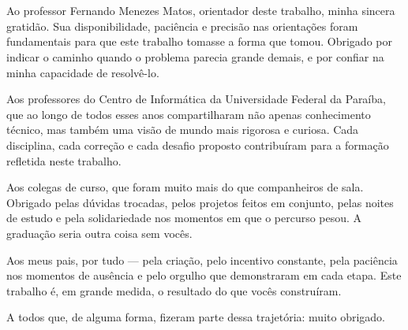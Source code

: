 \section*{}

Ao professor Fernando Menezes Matos, orientador deste trabalho, minha sincera gratidão. Sua disponibilidade, paciência e precisão nas orientações foram fundamentais para que este trabalho tomasse a forma que tomou. Obrigado por indicar o caminho quando o problema parecia grande demais, e por confiar na minha capacidade de resolvê-lo.

Aos professores do Centro de Informática da Universidade Federal da Paraíba, que ao longo de todos esses anos compartilharam não apenas conhecimento técnico, mas também uma visão de mundo mais rigorosa e curiosa. Cada disciplina, cada correção e cada desafio proposto contribuíram para a formação refletida neste trabalho.

Aos colegas de curso, que foram muito mais do que companheiros de sala. Obrigado pelas dúvidas trocadas, pelos projetos feitos em conjunto, pelas noites de estudo e pela solidariedade nos momentos em que o percurso pesou. A graduação seria outra coisa sem vocês.

Aos meus pais, por tudo --- pela criação, pelo incentivo constante, pela paciência nos momentos de ausência e pelo orgulho que demonstraram em cada etapa. Este trabalho é, em grande medida, o resultado do que vocês construíram.

A todos que, de alguma forma, fizeram parte dessa trajetória: muito obrigado.

